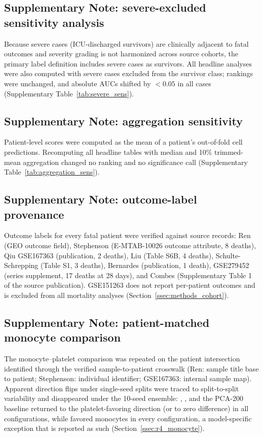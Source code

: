 \subsection{Supplementary Note: severe-excluded sensitivity analysis}
\label{sn:severe}

Because severe cases (ICU-discharged survivors) are clinically adjacent to
fatal outcomes and severity grading is not harmonized across source cohorts,
the primary label definition includes severe cases as survivors. All headline
analyses were also computed with severe cases excluded from the survivor class;
rankings were unchanged, and absolute AUCs shifted by $<0.05$ in all cases
(Supplementary Table~\ref{tab:severe_sens}).

\subsection{Supplementary Note: aggregation sensitivity}
\label{sn:aggregation}

Patient-level scores were computed as the mean of a patient's out-of-fold cell
predictions. Recomputing all headline tables with median and 10\% trimmed-mean
aggregation changed no ranking and no significance call
(Supplementary Table~\ref{tab:aggregation_sens}).

\subsection{Supplementary Note: outcome-label provenance}
\label{sn:label_provenance}

Outcome labels for every fatal patient were verified against source records:
Ren (GEO outcome field), Stephenson (E-MTAB-10026 outcome attribute, 8 deaths),
Qiu GSE167363 (publication, 2 deaths), Liu (Table S6B, 4 deaths),
Schulte-Schrepping (Table S1, 3 deaths), Bernardes (publication, 1 death),
GSE279452 (series supplement, 17 deaths at 28 days), and Combes (Supplementary
Table 1 of the source publication). GSE151263 does not report per-patient
outcomes and is excluded from all mortality analyses
(Section~\ref{ssec:methods_cohort}).

\subsection{Supplementary Note: patient-matched monocyte comparison}
\label{sn:monocyte_matched}

The monocyte--platelet comparison was repeated on the patient intersection
identified through the verified sample-to-patient crosswalk (Ren: sample title
base to patient; Stephenson: individual identifier; GSE167363: internal sample
map). Apparent direction flips under single-seed splits were traced to
split-to-split variability and disappeared under the 10-seed ensemble:
, , and the PCA-200 baseline returned to the
platelet-favoring direction (or to zero difference) in all configurations,
while  favored monocytes in every configuration, a model-specific
exception that is reported as such
(Section~\ref{ssec:r4_monocyte}).
